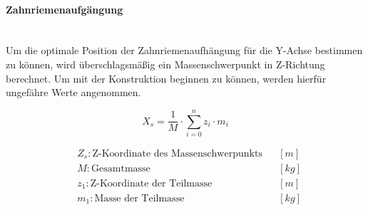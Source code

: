 \paragraph{Zahnriemenaufgängung}\mbox{}\\
Um die optimale Position der Zahnriemenaufhängung für die Y-Achse bestimmen zu können, wird überschlagsmäßig ein Massenschwerpunkt in Z-Richtung berechnet. Um mit der Konstruktion beginnen zu können, werden hierfür ungefähre Werte angenommen.

\noindent\begin{minipage}{\textwidth}
\begin{minipage}[t]{0.5\textwidth}
    \vspace{7mm}
    \begin{equation*}
        X_s = \frac{1}{M} \cdot \displaystyle\sum_{i = 0}^{n} z_i \cdot m_i
    \end{equation*}
\end{minipage}%
\begin{minipage}[t]{0.5\textwidth}
    \begin{align*}
        &Z_s: \text{Z-Koordinate des Massenschwerpunkts} & &\left[m\right]\\
        &M: \text{Gesamtmasse} & &\left[kg\right]\\
        &z_1: \text{Z-Koordinate der Teilmasse} & &\left[m\right] \\
        &m_1: \text{Masse der Teilmasse} & &\left[kg\right]
    \end{align*}
\end{minipage}
\end{minipage}

